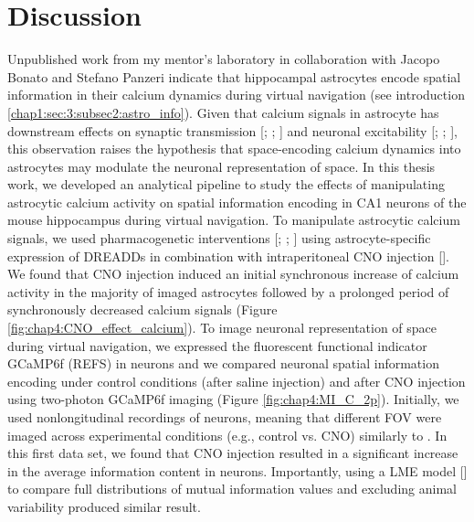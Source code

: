 
\chapter{Discussion} %

\label{Discussion} %
Unpublished work from my mentor's laboratory in collaboration with Jacopo Bonato and Stefano Panzeri indicate that hippocampal astrocytes encode spatial information in their calcium dynamics during virtual navigation (see introduction \ref{chap1:sec:3:subsec2:astro_info}). 
Given that calcium signals in astrocyte has downstream effects on synaptic transmission [\cite{panatier2006}; \cite{henneberger2010}; \cite{fellin2009}] and neuronal excitability [\cite{jourdain2007}; \cite{kang1998}; \cite{liu2004}], this observation raises the hypothesis that space-encoding calcium dynamics into astrocytes may modulate the neuronal representation of space. 
In this thesis work, we developed an analytical pipeline to study the effects of manipulating astrocytic calcium activity on spatial information encoding in CA1 neurons of the mouse hippocampus during virtual navigation. 
To manipulate astrocytic calcium signals, we used pharmacogenetic interventions [\cite{roth2016dreadds}; \cite{armbruster2005creation}; \cite{armbruster2007evolving}] using astrocyte-specific expression of DREADDs in combination with intraperitoneal CNO injection [\cite{adamsky2018astrocytic}].
We found that CNO injection induced an initial synchronous increase of calcium activity in the majority of imaged astrocytes followed by a prolonged period of synchronously decreased calcium signals (Figure \ref{fig:chap4:CNO_effect_calcium}). 
To image neuronal representation of space during virtual navigation, we expressed the fluorescent functional indicator GCaMP6f (REFS) in neurons and we compared neuronal spatial information encoding under control conditions (after saline injection) and after CNO injection using two-photon GCaMP6f imaging (Figure \ref{fig:chap4:MI_C_2p}). 
Initially, we used nonlongitudinal recordings of neurons, meaning that different FOV were imaged across experimental conditions (e.g., control vs. CNO) similarly to \cite{dombeck2010}.
In this first data set, we found that CNO injection resulted in a significant increase in the average information content in neurons.
Importantly, using a LME model [\cite{pinheiro2000linear}] to compare full distributions of mutual information values and excluding animal variability produced similar result. 

